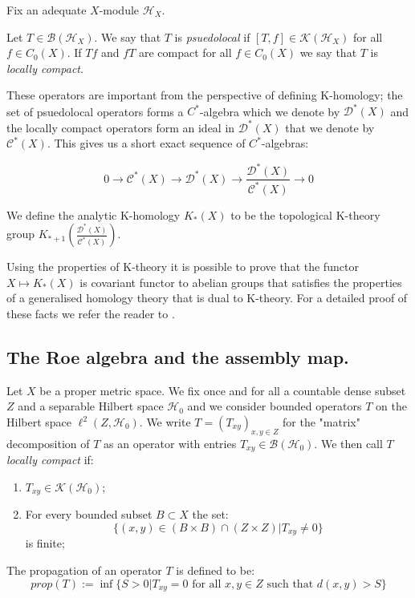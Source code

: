 Fix an adequate $X$-module $\mathcal{H}_{X}$.

\begin{definition}
Let $T \in \mathcal{B}(\mathcal{H}_{X})$. We say that $T$ is \textit{psuedolocal} if $[T,f] \in \mathcal{K}(\mathcal{H}_{X})$ for all $f \in C_{0}(X)$. If $Tf$ and $fT$ are compact for all $f \in C_{0}(X)$ we say that $T$ is \textit{locally compact}.
\end{definition}

These operators are important from the perspective of defining K-homology; the set of psuedolocal operators forms a $C^{*}$-algebra which we denote by $\mathcal{D}^{*}(X)$ and the locally compact operators form an ideal in $\mathcal{D}^{*}(X)$ that we denote by $\mathcal{C}^{*}(X)$. This gives us a short exact sequence of $C^{*}$-algebras:

\begin{equation*}
0 \rightarrow \mathcal{C}^{*}(X) \rightarrow \mathcal{D}^{*}(X) \rightarrow \frac{\mathcal{D}^{*}(X)}{\mathcal{C}^{*}(X)}\rightarrow 0
\end{equation*} 

\begin{definition}
We define the analytic K-homology $K_{*}(X)$ to be the topological K-theory group $K_{*+1}(\frac{\mathcal{D}^{*}(X)}{\mathcal{C}^{*}(X)})$.
\end{definition}

Using the properties of K-theory it is possible to prove that the functor $X \mapsto K_{*}(X)$ is covariant functor to abelian groups that satisfies the properties of a generalised homology theory that is dual to K-theory. For a detailed proof of these facts we refer the reader to \cite{MR1399087,MR1817560}.

\subsection{The Roe algebra and the assembly map.}

Let $X$ be a proper metric space. We fix once and for all a countable dense subset $Z$ and a separable Hilbert space $\mathcal{H}_{0}$ and we consider bounded operators $T$ on the Hilbert space $\ell^{2}(Z,\mathcal{H}_{0})$. We write $T=(T_{xy})_{x,y \in Z}$ for the "matrix" decomposition of $T$ as an operator with entries $T_{xy} \in \mathcal{B}(\mathcal{H}_{0})$. We then call $T$ \textit{locally compact} if:
\begin{enumerate}
\item $T_{xy}\in \mathcal{K}(\mathcal{H}_{0})$;
\item For every bounded subset $B \subset X$ the set:
\begin{equation*}
\lbrace (x,y)\in (B \times B) \cap (Z \times Z) | T_{xy}\not= 0 \rbrace 
\end{equation*}
is finite;
\end{enumerate} 
The propagation of an operator $T$ is defined to be:
\begin{equation*}
prop(T):= \inf \lbrace S>0 | T_{xy}=0 \mbox{ for all } x,y \in Z \mbox{ such that } d(x,y)>S \rbrace
\end{equation*}

